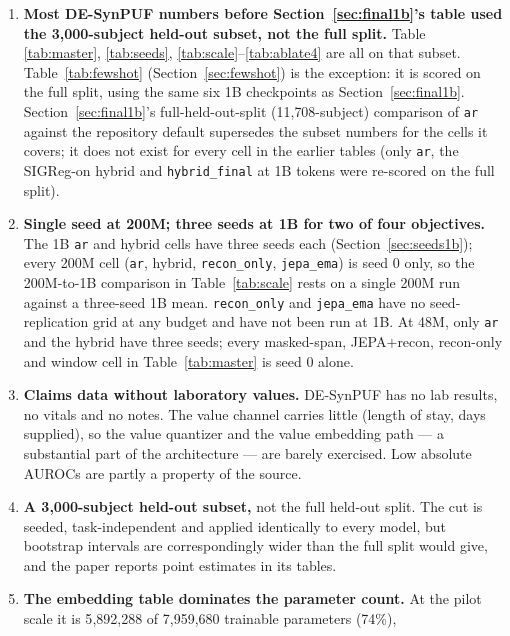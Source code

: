 \documentclass[11pt,a4paper]{article}
\newcommand{\code}[1]{\texttt{\small #1}}
\begin{document}
\begin{enumerate}[leftmargin=*,itemsep=3pt,topsep=3pt]
\item \textbf{Most DE-SynPUF numbers before Section~\ref{sec:final1b}'s table
      used the 3{,}000-subject held-out subset, not the full split.} Table
      \ref{tab:master}, \ref{tab:seeds},
      \ref{tab:scale}--\ref{tab:ablate4} are all on that subset.
      Table~\ref{tab:fewshot} (Section~\ref{sec:fewshot}) is the exception:
      it is scored on the full split, using the same six 1B checkpoints as
      Section~\ref{sec:final1b}. Section~\ref{sec:final1b}'s full-held-out-split
      (11{,}708-subject) comparison of \code{ar} against the repository
      default supersedes the subset numbers for the cells it covers; it does
      not exist for every cell in the earlier tables (only \code{ar}, the
      SIGReg-on hybrid and \code{hybrid\_final} at 1B tokens were re-scored
      on the full split).
\item \textbf{Single seed at 200M; three seeds at 1B for two of four
      objectives.} The 1B \code{ar} and hybrid cells have three seeds each
      (Section~\ref{sec:seeds1b}); every 200M cell (\code{ar}, hybrid,
      \code{recon\_only}, \code{jepa\_ema}) is seed 0 only, so the 200M-to-1B
      comparison in Table~\ref{tab:scale} rests on a single 200M run against a
      three-seed 1B mean. \code{recon\_only} and \code{jepa\_ema} have no
      seed-replication grid at any budget and have not been run at 1B. At
      48M, only \code{ar} and the hybrid have three seeds; every masked-span,
      JEPA$+$recon, recon-only and window cell in Table~\ref{tab:master} is
      seed 0 alone.
\item \textbf{Claims data without laboratory values.} DE-SynPUF has no lab
      results, no vitals and no notes. The value channel carries little
      (length of stay, days supplied), so the value quantizer and the value
      embedding path --- a substantial part of the architecture --- are barely
      exercised. Low absolute AUROCs are partly a property of the source.
\item \textbf{A 3{,}000-subject held-out subset,} not the full held-out split.
      The cut is seeded, task-independent and applied identically to every
      model, but bootstrap intervals are correspondingly wider than the full
      split would give, and the paper reports point estimates in its tables.
\item \textbf{The embedding table dominates the parameter count.} At the pilot
      scale it is 5{,}892{,}288 of 7{,}959{,}680 trainable parameters (74\%),

\end{enumerate}
\end{document}
